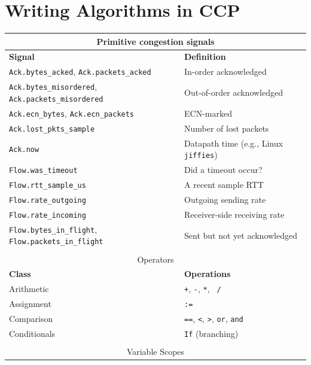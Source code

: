 \section{Writing Algorithms in CCP}
\label{sec:ccp}
\begin{table}
    \centering
    \footnotesize
    \begin{tabular}{p{}p{}}
        \hline
        \hline
        \multicolumn{2}{c}{Primitive congestion signals} \\
        \hline
        \hline
        \textbf{Signal} & \textbf{Definition} \\
        \texttt{Ack.bytes\_acked}, \texttt{Ack.packets\_acked} & In-order acknowledged \\
        \texttt{Ack.bytes\_misordered}, \texttt{Ack.packets\_misordered} & Out-of-order acknowledged \\
        \texttt{Ack.ecn\_bytes}, \texttt{Ack.ecn\_packets} & ECN-marked \\
        \texttt{Ack.lost\_pkts\_sample} & Number of lost packets \\
        \texttt{Ack.now} & Datapath time (e.g., Linux \texttt{jiffies})\\
        \texttt{Flow.was\_timeout} & Did a timeout occur? \\
        \texttt{Flow.rtt\_sample\_us} & A recent sample RTT \\
        \texttt{Flow.rate\_outgoing} & Outgoing sending rate \\
        \texttt{Flow.rate\_incoming} & Receiver-side receiving rate  \\
        \texttt{Flow.bytes\_in\_flight}, \texttt{Flow.packets\_in\_flight} & Sent but not yet acknowledged \\
        & \\
        \hline
        \hline
        \multicolumn{2}{c}{Operators} \\
        \hline
        \hline
        \textbf{Class} & \textbf{Operations} \\
        Arithmetic & \texttt{+}, \texttt{-}, \texttt{*}, \texttt{~/} \\
        Assignment & \texttt{:=} \\
        Comparison & \texttt{==}, \texttt{<}, \texttt{>}, \texttt{or}, \texttt{and} \\
        Conditionals & \texttt{If} (branching) \\
        & \\
        \hline
        \hline
        \multicolumn{2}{c}{Variable Scopes} \\

\end{tabular}
\end{table}

